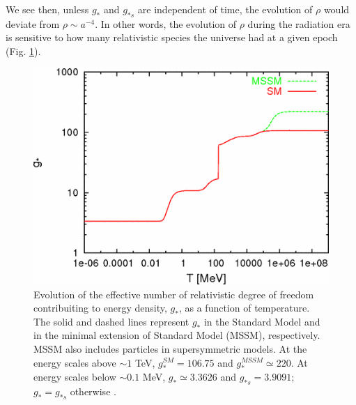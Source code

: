 \documentclass[11pt,a4paper,twoside]{book}
\begin{document}
We see then, unless $ g_{*} $ and $ g_{*s} $ are independent of time, the evolution of $\rho$ would deviate from $\rho \sim a^{-4}$. In other words, the evolution of $\rho$ during the radiation era is sensitive to how many relativistic species the universe had at a given epoch (Fig. \ref{fig:watanabekomatsufig2}).\\
\begin{figure}
	\centering
	\includegraphics[width=0.7\linewidth, height=0.25\textheight]{Images/Chap3/Watanabe_Komatsu_Fig2}
	\caption{Evolution of the effective number of relativistic degree of freedom contribuiting to energy density, $ g_{*} $, as a function of temperature. The solid and dashed lines represent  $ g_{*} $ in the Standard Model and in the minimal extension of Standard Model (MSSM), respectively. MSSM also includes particles in supersymmetric models. At the energy scales above $ \sim 1$ TeV, $ g_{*}^{SM}=106.75 $ and $ g_{*}^{MSSM} \simeq 220 $. At energy scales below $ \sim 0.1 $ MeV, $ g_{*}\simeq 3.3626 $ and $ g_{*s}=3.9091 $; $ g_{*}=g_{*s} $ otherwise \cite{Chap3:GW_Watanabe_Komatsu}. }
	\label{fig:watanabekomatsufig2}
\end{figure}
\end{document}
